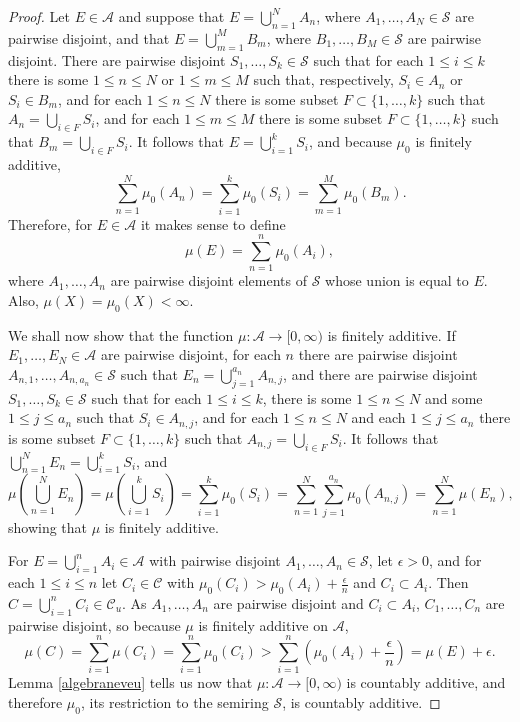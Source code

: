 \documentclass{article}
\theoremstyle{definition}
\begin{document}
\begin{proof}
Let  $E \in \mathscr{A}$ and suppose that
$E=\bigcup_{n=1}^N A_n$, where $A_1,\ldots,A_N \in \mathscr{S}$ are pairwise disjoint,
and that $E=\bigcup_{m=1}^M B_m$, where $B_1,\ldots,B_M \in \mathscr{S}$ are pairwise disjoint. 
There are pairwise disjoint
$S_1,\ldots,S_k \in \mathscr{S}$ such that for each $1 \leq i \leq k$ there is some $1 \leq n \leq N$ or  $1 \leq m \leq M$
such that, respectively, $S_i \in A_n$ or $S_i \in B_m$, and for each $1 \leq n \leq N$ there is some subset $F \subset \{1,\ldots,k\}$
such that $A_n = \bigcup_{i \in F} S_i$, and for each $1 \leq m \leq M$ there is some subset $F \subset \{1,\ldots,k\}$
such that $B_m = \bigcup_{i \in F} S_i$. 
It follows that $E=\bigcup_{i=1}^k S_i$, and because $\mu_0$ is finitely additive,
\[
\sum_{n=1}^N \mu_0(A_n) = \sum_{i=1}^k \mu_0(S_i) = \sum_{m=1}^M \mu_0(B_m).
\]
Therefore, for $E \in \mathscr{A}$ it makes sense to define 
\[
\mu(E) = \sum_{n=1}^n \mu_0(A_i),
\]
where $A_1,\ldots,A_n$ are pairwise disjoint elements of $\mathscr{S}$ whose union is equal to $E$.
Also, $\mu(X)=\mu_0(X)<\infty$.

We shall now show that the function $\mu:\mathscr{A} \to [0,\infty)$ is finitely additive.
If $E_1,\ldots,E_N \in \mathscr{A}$ are pairwise disjoint, for each $n$ there are pairwise disjoint
$A_{n,1},\ldots,A_{n,a_n} \in \mathscr{S}$ such that $E_n = \bigcup_{j=1}^{a_n} A_{n,j}$, 
and there are pairwise disjoint $S_1,\ldots,S_k \in \mathscr{S}$ such that for each
$1 \leq i \leq k$, there is some $1 \leq n \leq N$ and some $1 \leq j \leq a_n$ such that
$S_i \in A_{n,j}$, and for each $1 \leq n \leq N$ and each $1 \leq j \leq a_n$ there is some subset $F \subset
\{1,\ldots,k\}$ such that $A_{n,j} = \bigcup_{i \in F} S_i$. It follows that
$\bigcup_{n=1}^N E_n = \bigcup_{i=1}^k S_i$, and
\[
\mu\left(\bigcup_{n=1}^N E_n \right) = \mu\left( \bigcup_{i=1}^k S_i \right) 
=\sum_{i=1}^k \mu_0(S_i) = \sum_{n=1}^N \sum_{j=1}^{a_n} \mu_0(A_{n,j})
=\sum_{n=1}^N \mu(E_n),
\]
showing that $\mu$ is finitely additive. 

For $E=\bigcup_{i=1}^n A_i \in \mathscr{A}$
with pairwise disjoint $A_1,\ldots,A_n \in \mathscr{S}$, let $\epsilon>0$, and for each $1 \leq i \leq n$ let
$C_i \in \mathscr{C}$ with
$\mu_0(C_i)>\mu_0(A_i)+\frac{\epsilon}{n}$ and $C_i \subset A_i$. Then $C=\bigcup_{i=1}^n C_i \in \mathscr{C}_u$. 
As $A_1,\ldots,A_n$ are pairwise disjoint and $C_i \subset A_i$, $C_1,\ldots,C_n$ are pairwise disjoint, so
because $\mu$ is finitely additive on $\mathscr{A}$,
\[
\mu(C) = \sum_{i=1}^n \mu(C_i) = \sum_{i=1}^n \mu_0(C_i) > \sum_{i=1}^n \left(\mu_0(A_i)+\frac{\epsilon}{n}\right)
=\mu(E)+\epsilon.
\]
 Lemma \ref{algebraneveu} tells us now that $\mu:\mathscr{A} \to [0,\infty)$ is countably additive, and therefore $\mu_0$, its restriction to
 the semiring $\mathscr{S}$, is countably additive.
\end{proof}
\end{document}
